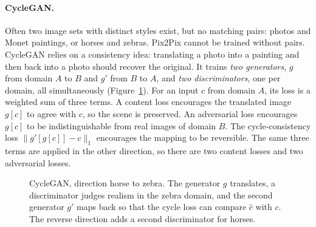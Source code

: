 \paragraph{CycleGAN.}
Often two image sets with distinct styles exist, but no matching pairs: photos
and Monet paintings, or horses and zebras. Pix2Pix cannot be trained without
pairs. CycleGAN relies on a consistency idea: translating a photo into a
painting and then back into a photo should recover the original.
It trains \emph{two generators}, $g$ from domain $A$ to $B$ and $g'$ from $B$
to $A$, and \emph{two discriminators}, one per domain, all simultaneously
(Figure~\ref{fig:cyclegan}). For an input $c$ from domain $A$, its loss is a
weighted sum of three terms. A content loss encourages the translated image
$g[c]$ to agree with $c$, so the scene is preserved. An adversarial loss
encourages $g[c]$ to be indistinguishable from real images of domain $B$. The
cycle-consistency loss $\|g'[g[c]]-c\|_1$ encourages the mapping to be
reversible. The same three terms are applied in the other direction, so there
are two content losses and two adversarial losses.

\begin{figure}[ht]
  \centering
  \caption{CycleGAN, direction horse to zebra. The generator $g$ translates, a
  discriminator judges realism in the zebra domain, and the second generator
  $g'$ maps back so that the cycle loss can compare $\hat c$ with $c$. The
  reverse direction adds a second discriminator for horses.}
  \label{fig:cyclegan}
\end{figure}

